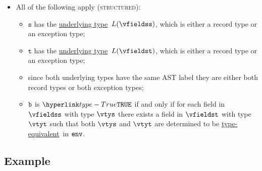 \documentclass{book}
\newcommand\underlyingtype[0]{\hyperlink{def-underlyingtype}{underlying type}}
\newcommand\typeequivalent[0]{\hyperlink{def-typeequal}{type-equivalent}}
\newcommand\vt[0]{\texttt{t}}
\newcommand\vs[0]{\texttt{s}}
\begin{document}
\begin{itemize}
\item All of the following apply (\textsc{structured}):
  \begin{itemize}
  \item $\vs$ has the \underlyingtype\ $L(\vfieldss)$, which is either a record type or an exception type;
  \item $\vt$ has the \underlyingtype\ $L(\vfieldst)$, which is either a record type or an exception type;
  \item since both underlying types have the same AST label they are either both record types or both exception types;
  \item $\texttt{b}$ is $\True$ if and only if for each field in $\vfieldss$ with type $\vtys$
  there exists a field in $\vfieldst$ with type $\vtyt$ such that both $\vtys$ and $\vtyt$
  are determined to be \typeequivalent\ in $\texttt{env}$.
  \end{itemize}
\end{itemize}

\subsection{Example}

\end{document}
